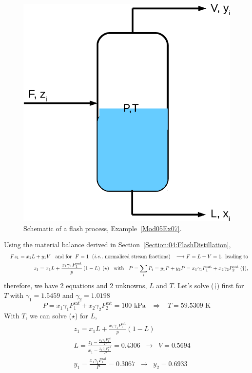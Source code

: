 \documentclass[12pts,a4paper,amsmath,amssymb,floatfix]{article}%
\newcommand{\frc}{\displaystyle\frac}
\newcommand{\ie}{{\it i.e., }}
\newcommand{\summation}[3][error]{\sum\limits_{#2}^{#3}#1}
\begin{document}
\begin{enumerate}[1)]
  \begin{figure}[h]
     \begin{center}
         \includegraphics[width=.25\linewidth,clip]{./Figs/FlashDistillation}
     \end{center}
     \caption{Schematic of a flash process, Example~\ref{Mod05Ex07}.}
  \end{figure}

 Using the material balance derived in Section~\ref{Section:04:FlashDistillation},
\begin{eqnarray}
    && Fz_{1} = x_{1}L + y_{1}V\;\;\text{ and for } \;F=1\;\text{ (\ie normalised stream fractions)}\;\;\;\longrightarrow F = L + V = 1,\text{ leading to} \nonumber \\
    && z_{1} = x_{1}L + \frc{x_{1}\gamma_{1}P_{1}^{\text{sat}}}{p}\left(1-L\right)\;(\star)\;\; \text{ with }\;\; P=\summation[P_{i}]{i}{} = y_{1}P + y_{2}P = x_{1}\gamma_{1}P_{1}^{\text{sat}} + x_{2}\gamma_{2}P_{2}^{\text{sat}}\;(\dagger),\nonumber
\end{eqnarray}
therefore, we have 2 equations and 2 unknowns, $L$ and $T$. Let's solve ($\dagger$) first for $T$ with $\gamma_{1}=1.5459$ and $\gamma_{2}=1.0198$
   \begin{displaymath}
       P = x_{1}\gamma_{1}P_{1}^{\text{sat}} + x_{2}\gamma_{2}P_{2}^{\text{sat}} = 100 \text{ kPa} \;\;\;\Rightarrow\;\;\; T = 59.5309\text{ K}
   \end{displaymath}
 With $T$, we can solve ($\star$) for $L$,
   \begin{eqnarray}
       && z_{1} = x_{1}L + \frc{x_{1}\gamma_{1}P_{1}^{\text{sat}}}{p}\left(1-L\right) \nonumber \\
       && L = \frc{z_{1} - \frac{x_{1}\gamma_{1}P_{1}^{\text{sat}}}{P}}{x_{1} - \frac{x_{1}\gamma_{1}P_{1}^{\text{sat}}}{P}} = 0.4306\;\;\rightarrow \;\; V = 0.5694 \nonumber \\
       && y_{1} = \frac{x_{1}\gamma_{1}P_{1}^{\text{sat}}}{P} = 0.3067\;\;\rightarrow \;\; y_{2} = 0.6933\nonumber
   \end{eqnarray}
 



\end{enumerate}
\end{document}
